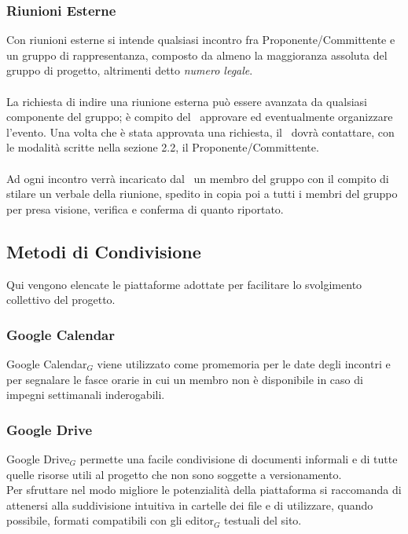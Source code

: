 \subsubsection{Riunioni Esterne} \label{collaborazioneriunioniesterne}
Con riunioni esterne si intende qualsiasi incontro fra Proponente/Committente
e un gruppo di rappresentanza, composto da almeno la maggioranza assoluta del
gruppo di progetto, altrimenti detto \textit{numero legale}.\\
\\
La richiesta di indire una riunione esterna può essere avanzata da qualsiasi componente del gruppo; è compito del \ruoloResponsabile\ approvare ed eventualmente organizzare l'evento. Una volta che è stata approvata una richiesta, il \ruoloResponsabile\ dovrà contattare, con le modalità scritte nella sezione 2.2, il Proponente/Committente.
\\\\
Ad ogni incontro verrà incaricato dal \ruoloResponsabile\ un membro del gruppo con il compito di stilare un verbale della riunione, spedito in copia poi a tutti i membri del gruppo per presa visione, verifica e conferma di quanto riportato.






\subsection{Metodi di Condivisione}
Qui vengono elencate le piattaforme adottate per facilitare lo svolgimento collettivo del progetto.

\subsubsection{Google Calendar}
Google Calendar$_G$ viene utilizzato come promemoria per le date degli incontri e per segnalare le fasce orarie in cui un membro non è disponibile in caso di impegni settimanali inderogabili.

\subsubsection{Google Drive}
Google Drive$_G$ permette una facile condivisione di documenti informali e di tutte quelle risorse utili al progetto che non sono soggette a versionamento. \\
Per sfruttare nel modo migliore le potenzialità della piattaforma si raccomanda di attenersi alla suddivisione intuitiva in cartelle dei file e di utilizzare, quando possibile, formati compatibili con gli editor$_G$ testuali del sito.

